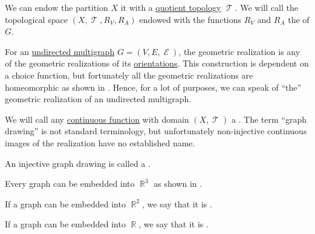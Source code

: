 \begin{definition}
  We can endow the partition \( X \) it with a \hyperref[def:topological_quotient]{quotient topology} \( \mscrT \). We will call the topological space \( (X, \mscrT, R_V, R_A) \) endowed with the functions \( R_V \) and \( R_A \) the  of \( G \).

  \begin{thmenum}
     For an \hyperref[def:undirected_multigraph]{undirected multigraph} \( G = (V, E, \mscrE) \), the geometric realization is any of the geometric realizations of its \hyperref[def:multigraph_orientation]{orientations}. This construction is dependent on a choice function, but fortunately all the geometric realizations are homeomorphic as shown in . Hence, for a lot of purposes, we can speak of \enquote{the} geometric realization of an undirected multigraph.

     We will call any \hyperref[def:global_continuity]{continuous function} with domain \( (X, \mscrT) \) a . The term \enquote{graph drawing} is not standard terminology, but unfortunately non-injective continuous images of the realization have no established name.

     An injective graph drawing is called a .

    Every graph can be embedded into \( \BbbR^3 \) as shown in .

     If a graph can be embedded into \( \BbbR^2 \), we say that it is .

     If a graph can be embedded into \( \BbbR \), we say that it is .
  \end{thmenum}
\end{definition}

